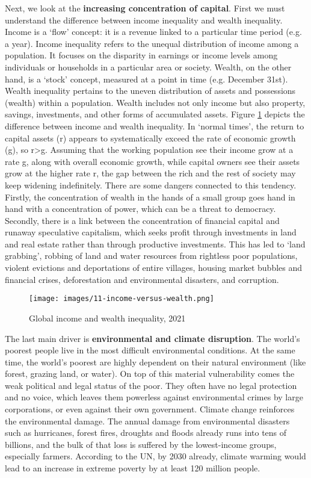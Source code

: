 \documentclass[../summary.tex]{subfiles}
\begin{document}
	 Next, we look at the \textbf{increasing concentration of capital}. First we must understand the difference between income inequality and wealth inequality. Income is a `flow' concept: it is a revenue linked to a particular time period (e.g. a year). Income inequality refers to the unequal distribution of income among a population. It focuses on the disparity in earnings or income levels among individuals or households in a particular area or society. Wealth, on the other hand, is a `stock' concept, measured at a point in time (e.g. December 31st). Wealth inequality pertains to the uneven distribution of assets and possessions (wealth) within a population. Wealth includes not only income but also property, savings, investments, and other forms of accumulated assets. Figure \ref{fig:income-versus-wealth} depicts the difference between income and wealth inequality. In `normal times', the return to capital assets (r) appears to systematically exceed the rate of economic growth (g), so r>g. Assuming that the working population see their income grow at a rate g, along with overall economic growth, while capital owners see their assets grow at the higher rate r, the gap between the rich and the rest of society may keep widening indefinitely. There are some dangers connected to this tendency. Firstly, the concentration of wealth in the hands of a small group goes hand in hand with a concentration of power, which can be a threat to democracy. Secondly, there is a link between the concentration of financial capital and runaway speculative capitalism, which seeks profit through investments in land and real estate rather than through productive investments. This has led to `land grabbing', robbing of land and water resources from rightless poor populations, violent evictions and deportations of entire villages, housing market bubbles and financial crises, deforestation and environmental disasters, and corruption.
	 \\
	 \begin{figure}[htbp]
	 	\centering
	 	\texttt{[image: images/11-income-versus-wealth.png]}
	 	\caption{Global income and wealth inequality, 2021}
	 	\label{fig:income-versus-wealth}
	 \end{figure}
	
	The last main driver is \textbf{environmental and climate disruption}. The world's poorest people live in the most difficult environmental conditions. At the same time, the world's poorest are highly dependent on their natural environment (like forest, grazing land, or water). On top of this material vulnerability comes the weak political and legal status of the poor. They often have no legal protection and no voice, which leaves them powerless against environmental crimes by large corporations, or even against their own government. Climate change reinforces the environmental damage. The annual damage from environmental disasters such as hurricanes, forest fires, droughts and floods already runs into tens of billions, and the bulk of that loss is suffered by the lowest-income groups, especially farmers. According to the UN, by 2030 already, climate warming would lead to an increase in extreme poverty by at least 120 million people.	
	\newpage
\end{document}
